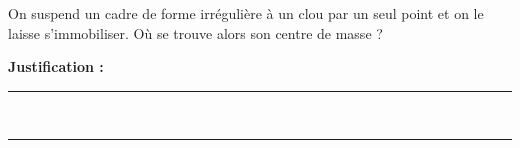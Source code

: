 On suspend un cadre de forme irrégulière à un clou par un seul point et on le laisse s'immobiliser. Où se trouve alors son centre de masse ?

\choices

\noindent\textbf{Justification :} \hrulefill \\[2.5ex]
\rule{\linewidth}{0.4pt} \\[2.5ex]
\rule{\linewidth}{0.4pt}
\vfill
